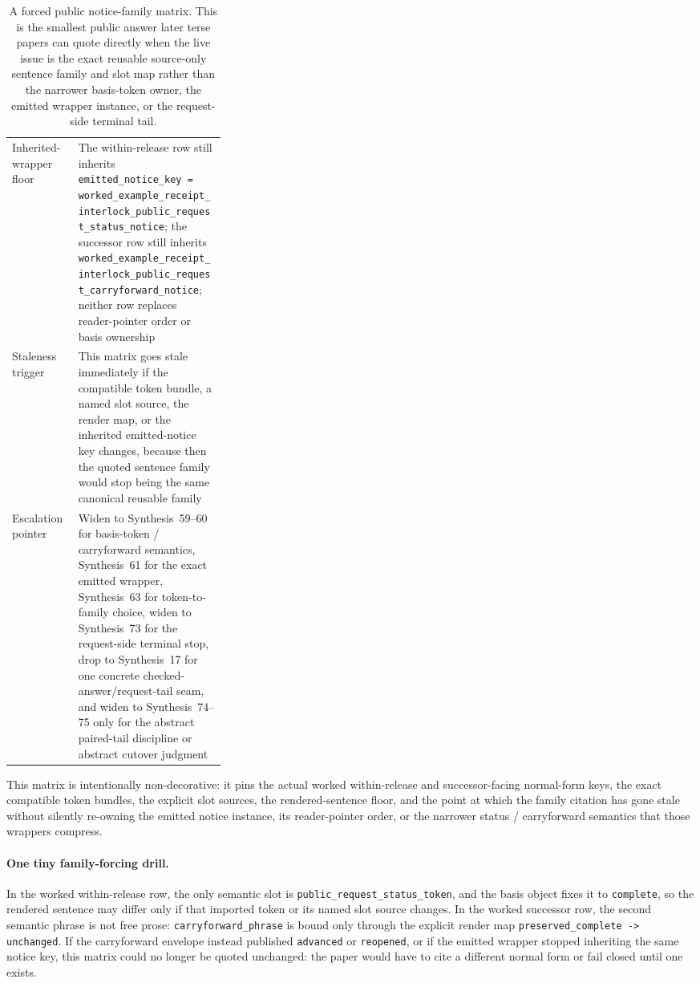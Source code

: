 \documentclass[11pt]{article}
\begin{document}
\begin{table}[t]
\begin{tabularx}{0.97\linewidth}{@{}p{0.31\linewidth}X@{}}
Inherited-wrapper floor & The within-release row still inherits \texttt{emitted\_notice\_key = worked\_example\_receipt\_interlock\_public\_request\_status\_notice}; the successor row still inherits \texttt{worked\_example\_receipt\_interlock\_public\_request\_carryforward\_notice}; neither row replaces reader-pointer order or basis ownership \\
Staleness trigger & This matrix goes stale immediately if the compatible token bundle, a named slot source, the render map, or the inherited emitted-notice key changes, because then the quoted sentence family would stop being the same canonical reusable family \\
Escalation pointer & Widen to Synthesis~59--60 for basis-token / carryforward semantics, Synthesis~61 for the exact emitted wrapper, Synthesis~63 for token-to-family choice, widen to Synthesis~73 for the request-side terminal stop, drop to Synthesis~17 for one concrete checked-answer/request-tail seam, and widen to Synthesis~74--75 only for the abstract paired-tail discipline or abstract cutover judgment \\
\bottomrule
\end{tabularx}
\caption{A forced public notice-family matrix. This is the smallest public answer later terse papers can quote directly when the live issue is the exact reusable source-only sentence family and slot map rather than the narrower basis-token owner, the emitted wrapper instance, or the request-side terminal tail.}
\label{tab:forced-public-notice-family-matrix}
\end{table}

This matrix is intentionally non-decorative: it pins the actual worked within-release and successor-facing normal-form keys, the exact compatible token bundles, the explicit slot sources, the rendered-sentence floor, and the point at which the family citation has gone stale without silently re-owning the emitted notice instance, its reader-pointer order, or the narrower status / carryforward semantics that those wrappers compress.\cite{series:workedexample}

\paragraph{One tiny family-forcing drill.}
In the worked within-release row, the only semantic slot is \texttt{public\_request\_status\_token}, and the basis object fixes it to \texttt{complete}, so the rendered sentence may differ only if that imported token or its named slot source changes. In the worked successor row, the second semantic phrase is not free prose: \texttt{carryforward\_phrase} is bound only through the explicit render map \texttt{preserved\_complete -> unchanged}. If the carryforward envelope instead published \texttt{advanced} or \texttt{reopened}, or if the emitted wrapper stopped inheriting the same notice key, this matrix could no longer be quoted unchanged: the paper would have to cite a different normal form or fail closed until one exists.\cite{series:workedexample}
\end{document}
